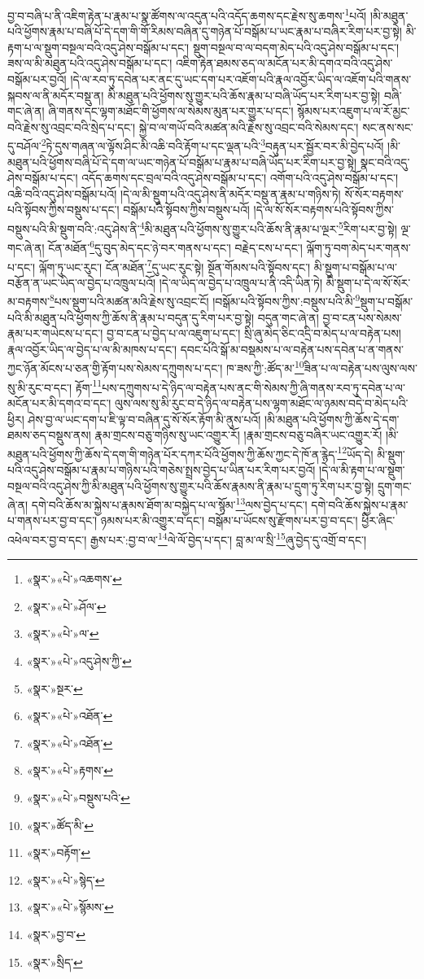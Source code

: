 བྱ་བ་བཞི་པ་ནི་འཇིག་རྟེན་པ་རྣམ་པ་སྣ་ཚོགས་ལ་འདུན་པའི་འདོད་ཆགས་དང་རྗེས་སུ་ཆགས་\footnote{«སྣར་»«པེ་»འཆགས་}པའོ། །མི་མཐུན་པའི་ཕྱོགས་རྣམ་པ་བཞི་པོ་དེ་དག་གི་གོ་རིམས་བཞིན་དུ་གཉེན་པོ་བསྒོམ་པ་ཡང་རྣམ་པ་བཞིར་རིག་པར་བྱ་སྟེ། མི་རྟག་པ་ལ་སྡུག་བསྔལ་བའི་འདུ་ཤེས་བསྒོམ་པ་དང་། སྡུག་བསྔལ་བ་ལ་བདག་མེད་པའི་འདུ་ཤེས་བསྒོམ་པ་དང་། ཟས་ལ་མི་མཐུན་པའི་འདུ་ཤེས་བསྒོམ་པ་དང་། འཇིག་རྟེན་ཐམས་ཅད་ལ་མངོན་པར་མི་དགའ་བའི་འདུ་ཤེས་བསྒོམ་པར་བྱའོ། །དེ་ལ་རབ་ཏུ་དབེན་པར་ནང་དུ་ཡང་དག་པར་འཇོག་པའི་རྣལ་འབྱོར་ཡིད་ལ་འཇོག་པའི་གནས་སྐབས་ལ་ནི་མདོར་བསྡུ་ན། མི་མཐུན་པའི་ཕྱོགས་སུ་གྱུར་པའི་ཆོས་རྣམ་པ་བཞི་ཡོད་པར་རིག་པར་བྱ་སྟེ། བཞི་གང་ཞེ་ན། ཞི་གནས་དང་ལྷག་མཐོང་གི་ཕྱོགས་ལ་སེམས་མུན་པར་གྱུར་པ་དང་། སྙོམས་པར་འཇུག་པ་ལ་རོ་མྱང་བའི་རྗེས་སུ་འབྲང་བའི་སྲེད་པ་དང་། སྐྱེ་བ་ལ་གཡོ་བའི་མཚན་མའི་རྗེས་སུ་འབྲང་བའི་སེམས་དང་། སང་ནས་སང་དུ་བཤོལ་\footnote{«སྣར་»«པེ་»ཤོལ་}ཏེ་དུས་གཞན་ལ་ལྟོས་ཤིང་མི་འཆི་བའི་རྟོག་པ་དང་ལྡན་པའི་\footnote{«སྣར་»«པེ་»ལ་}བརྟུན་པར་སྦྱོར་བར་མི་བྱེད་པའོ། །མི་མཐུན་པའི་ཕྱོགས་བཞི་པོ་དེ་དག་ལ་ཡང་གཉེན་པོ་བསྒོམ་པ་རྣམ་པ་བཞི་ཡོད་པར་རིག་པར་བྱ་སྟེ། སྣང་བའི་འདུ་ཤེས་བསྒོམ་པ་དང་། འདོད་ཆགས་དང་བྲལ་བའི་འདུ་ཤེས་བསྒོམ་པ་དང་། འགོག་པའི་འདུ་ཤེས་བསྒོམ་པ་དང་། འཆི་བའི་འདུ་ཤེས་བསྒོམ་པའོ། །དེ་ལ་མི་སྡུག་པའི་འདུ་ཤེས་ནི་མདོར་བསྡུ་ན་རྣམ་པ་གཉིས་ཏེ། སོ་སོར་བརྟགས་པའི་སྟོབས་ཀྱིས་བསྡུས་པ་དང་། བསྒོམ་པའི་སྟོབས་ཀྱིས་བསྡུས་པའོ། །དེ་ལ་སོ་སོར་བརྟགས་པའི་སྟོབས་ཀྱིས་བསྡུས་པའི་མི་སྡུག་བའི་:འདུ་ཤེས་ནི་\footnote{«སྣར་»«པེ་»འདུ་ཤེས་ཀྱི་}མི་མཐུན་པའི་ཕྱོགས་སུ་གྱུར་པའི་ཆོས་ནི་རྣམ་པ་ལྔར་\footnote{«སྣར་»སྔར་}རིག་པར་བྱ་སྟེ། ལྔ་གང་ཞེ་ན། ངོན་མཐོན་\footnote{«སྣར་»«པེ་»འཐོན་}དུ་བུད་མེད་དང་ཉེ་བར་གནས་པ་དང་། བརྗེད་ངས་པ་དང་། ལྐོག་ཏུ་བག་མེད་པར་གནས་པ་དང་། ལྐོག་ཏུ་ཡང་རུང་། ངོན་མཐོན་\footnote{«སྣར་»«པེ་»འཐོན་}དུ་ཡང་རུང་སྟེ། སྔོན་གོམས་པའི་སྟོབས་དང་། མི་སྡུག་པ་བསྒོམ་པ་ལ་བརྩོན་ན་ཡང་ཡིད་ལ་བྱེད་པ་འཁྲུལ་པའོ། །དེ་ལ་ཡིད་ལ་བྱེད་པ་འཁྲུལ་པ་ནི་འདི་ཡིན་ཏེ། མི་སྡུག་པ་དེ་ལ་སོ་སོར་མ་བརྟགས་\footnote{«སྣར་»«པེ་»རྟགས་}པས་སྡུག་པའི་མཚན་མའི་རྗེས་སུ་འབྲང་ངོ། །བསྒོམ་པའི་སྟོབས་ཀྱིས་:བསྡུས་པའི་མི་\footnote{«སྣར་»«པེ་»བསྡུས་པའི་}སྡུག་པ་བསྒོམ་པའི་མི་མཐུན་པའི་ཕྱོགས་ཀྱི་ཆོས་ནི་རྣམ་པ་བདུན་དུ་རིག་པར་བྱ་སྟེ། བདུན་གང་ཞེ་ན། བྱ་བ་ངན་པས་སེམས་རྣམ་པར་གཡེངས་པ་དང་། བྱ་བ་ངན་པ་བྱེད་པ་ལ་འཇུག་པ་དང་། སྲི་ཞུ་མེད་ཅིང་འདྲི་བ་མེད་པ་ལ་བརྟེན་པས། རྣལ་འབྱོར་ཡིད་ལ་བྱེད་པ་ལ་མི་མཁས་པ་དང་། དབང་པོའི་སྒོ་མ་བསྡམས་པ་ལ་བརྟེན་པས་དབེན་པ་ན་གནས་ཀྱང་ཉོན་མོངས་པ་ཅན་གྱི་རྟོག་པས་སེམས་དཀྲུགས་པ་དང་། ཁ་ཟས་ཀྱི་:ཚོད་མ་\footnote{«སྣར་»ཚོད་མི་}ཟིན་པ་ལ་བརྟེན་པས་ལུས་ལས་སུ་མི་རུང་བ་དང་། རྟོག་\footnote{«སྣར་»བརྟོག་}པས་དཀྲུགས་པ་དེ་ཉིད་ལ་བརྟེན་པས་ནང་གི་སེམས་ཀྱི་ཞི་གནས་རབ་ཏུ་དབེན་པ་ལ་མངོན་པར་མི་དགའ་བ་དང་། ལུས་ལས་སུ་མི་རུང་བ་དེ་ཉིད་ལ་བརྟེན་པས་ལྷག་མཐོང་ལ་ཉམས་བདེ་བ་མེད་པའི་ཕྱིར། ཤེས་བྱ་ལ་ཡང་དག་པ་ཇི་ལྟ་བ་བཞིན་དུ་སོ་སོར་རྟོག་མི་ནུས་པའོ། །མི་མཐུན་པའི་ཕྱོགས་ཀྱི་ཆོས་དེ་དག་ཐམས་ཅད་བསྡུས་ནས། རྣམ་གྲངས་བཅུ་གཉིས་སུ་ཡང་འགྱུར་རོ། །རྣམ་གྲངས་བཅུ་བཞིར་ཡང་འགྱུར་རོ། །མི་མཐུན་པའི་ཕྱོགས་ཀྱི་ཆོས་དེ་དག་གི་གཉེན་པོར་དཀར་པོའི་ཕྱོགས་ཀྱི་ཆོས་ཀྱང་དེ་ཁོ་ན་རྙེད་\footnote{«སྣར་»«པེ་»སྙེད་}ཡོད་དེ། མི་སྡུག་པའི་འདུ་ཤེས་བསྒོམ་པ་རྣམ་པ་གཉིས་པའི་གཅེས་སྤྲས་བྱེད་པ་ཡིན་པར་རིག་པར་བྱའོ། །དེ་ལ་མི་རྟག་པ་ལ་སྡུག་བསྔལ་བའི་འདུ་ཤེས་ཀྱི་མི་མཐུན་པའི་ཕྱོགས་སུ་གྱུར་པའི་ཆོས་རྣམས་ནི་རྣམ་པ་དྲུག་ཏུ་རིག་པར་བྱ་སྟེ། དྲུག་གང་ཞེ་ན། དགེ་བའི་ཆོས་མ་སྐྱེས་པ་རྣམས་ཐོག་མ་བསྐྱེད་པ་ལ་སྙོམ་\footnote{«སྣར་»«པེ་»སྙོམས་}ལས་བྱེད་པ་དང་། དགེ་བའི་ཆོས་སྐྱེས་པ་རྣམ་པ་གནས་པར་བྱ་བ་དང་། ཉམས་པར་མི་འགྱུར་བ་དང་། བསྒོམ་པ་ཡོངས་སུ་རྫོགས་པར་བྱ་བ་དང་། ཕྱིར་ཞིང་འཕེལ་བར་བྱ་བ་དང་། རྒྱས་པར་:བྱ་བ་ལ་\footnote{«སྣར་»བྱ་བ་}ལེ་ལོ་བྱེད་པ་དང་། བླ་མ་ལ་སྲི་\footnote{«སྣར་»སྲིད་}ཞུ་བྱེད་དུ་འགྲོ་བ་དང་། 